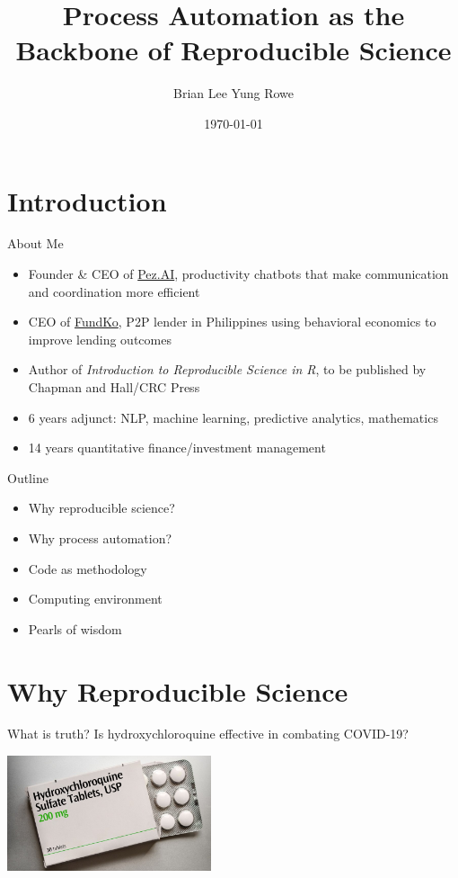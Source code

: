 \documentclass{beamer}
\title{Process Automation as the Backbone of Reproducible Science}
\date{\today}
\author{Brian Lee Yung Rowe}
\institute{Founder \& CEO, Pez.AI\\ CEO, FundKo}
\begin{document}
 
\maketitle 

\section{Introduction} 
\begin{frame}{About Me}

\begin{itemize}
\item Founder \& CEO of \href{https://pez.ai}{Pez.AI}, productivity chatbots that make communication and coordination more efficient
\item CEO of \href{https://fundko.com}{FundKo}, P2P lender in Philippines using behavioral economics to improve lending outcomes
\item Author of \emph{Introduction to Reproducible Science in R}, to be published by Chapman and Hall/CRC Press
\item 6 years adjunct: NLP, machine learning, predictive analytics, mathematics
\item 14 years quantitative finance/investment management
\end{itemize}
\end{frame} 


\begin{frame}{Outline}
\begin{itemize}
\item Why reproducible science?
\item Why process automation?
\item Code as methodology
\item Computing environment
\item Pearls of wisdom

\end{itemize} 
\end{frame} 


\section{Why Reproducible Science}

\begin{frame}{What is truth?}
Is hydroxychloroquine effective in combating COVID-19?

\includegraphics[width=6cm]{images/hydroxychloroquine}


\end{frame}
\end{document}
